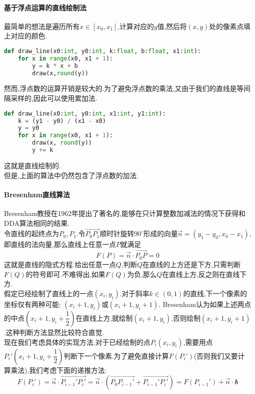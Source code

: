 \documentclass{ctexart}
\begin{document}
\paragraph{基于浮点运算的直线绘制法}
最简单的想法是遍历所有$x\in\left[x_0,x_1\right]$,计算对应的$y$值,然后将$(x,y)$处的像素点填上对应的颜色.
\begin{lstlisting}[language=Python]
def draw_line(x0:int, y0:int, k:float, b:float, x1:int):
    for x in range(x0, x1 + 1):
        y = k * x + b
        draw(x,round(y))
\end{lstlisting}
\indent 然而,浮点数的运算开销是较大的.为了避免浮点数的乘法,又由于我们的直线是等间隔采样的,因此可以使用累加法.
\begin{lstlisting}[language=Python]
def draw_line(x0:int, y0:int, x1:int, y1:int):
    k = (y1 - y0) / (x1 - x0)
    y = y0
    for x in range(x0, x1 + 1):
        draw(x, round(y))
        y += k
\end{lstlisting}
这就是直线绘制的.\\
\indent 但是,上面的算法中仍然包含了浮点数的加法.\paragraph{Bresenham直线算法} Bresenham教授在1962年提出了著名的,能够在只计算整数加减法的情况下获得和DDA算法相同的结果.\\
\indent 令直线的起终点为$P_0,P_1$.令$\overrightarrow{P_0P_1}$顺时针旋转$90^\circ$形成的向量$\vec{n}=\left(y_1-y_0,x_0-x_1\right)$,即直线的法向量,那么直线上任意一点$P$就满足
\[F(P)=\vec{n}\cdot\overrightarrow{P_0P}=0\]
这就是直线的隐式方程.给出任意一点$Q$,判断$Q$在直线的上方还是下方,只需判断$F(Q)$的符号即可.不难得出,如果$F(Q)$为负,那么$Q$在直线上方,反之则在直线下方.\\
\indent 假定已经绘制了直线上的一点$\left(x_i,y_i\right)$.对于斜率$k\in(0,1)$的直线,下一个像素的坐标仅有两种可能: $\left(
x_i+1,y_i\right)$或$\left(x_i+1,y_i+1\right)$. Bresenham认为如果上述两点的中点$\left(x_i+1,y_i+\dfrac12\right)$在直线上方,就绘制$\left(x_i+1,y_i\right)$,否则绘制$\left(x_i+1,y_i+1\right)$.这种判断方法显然比较符合直觉.\\
\indent 现在我们考虑具体的实现方法.对于已经绘制的点$P_i\left(x_i,y_i\right)$,需要用点$P_i'\left(x_i+1,y_i+\dfrac12\right)$判断下一个像素.为了避免直接计算$F\left(P_i'\right)$(否则我们又要计算乘法),我们考虑下面的递推方法:
\[F\left(P_i'\right)=\vec{n}\cdot\overrightarrow{P_{i-1}'P_i'}=\vec{n}\cdot\left(\overrightarrow{P_0P_{i-1}'}+\overrightarrow{P_{i-1}'P_i'}\right)=F\left(P_{i-1}'\right)+\vec{n}\cdot\boldsymbol{\delta}\]
\end{document}
